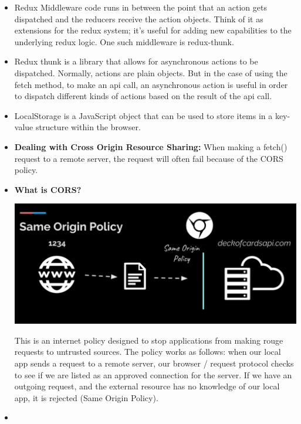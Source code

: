 \documentclass[8pt,a4paper]{extarticle}
\begin{document}
\begin{itemize}
\begin{verbatim}
\end{verbatim}

\item Redux Middleware code runs in between the point that an action gets dispatched and the reducers receive the action objects. Think of it as extensions for the redux system; it’s useful for adding new capabilities to the underlying redux logic. One such middleware is redux-thunk.

\item Redux thunk is a library that allows for asynchronous actions to be dispatched. Normally, actions are plain objects. But in the case of using the fetch method, to make an api call, an asynchronous action is useful in order to dispatch different kinds of actions based on the result of the api call.

\item LocalStorage is a JavaScript object that can be used to store items in a key-value structure within the browser.

\item \textbf{Dealing with Cross Origin Resource Sharing:} When making a fetch() request to a remote server, the request will often fail because of the CORS policy. 
\item \textbf{What is CORS?}

\includegraphics[scale=0.22]{cors.png}

This is an internet policy designed to stop applications from making rouge requests to untrusted sources. The policy works as follows: when our local app sends a request to a remote server, our browser / request protocol checks to see if we are listed as an approved connection for the server. If we have an outgoing request, and the external resource has no knowledge of our local app, it is rejected (Same Origin Policy).
\item
\end{itemize}
\end{document}
